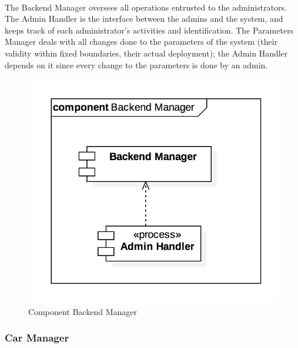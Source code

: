 		\paragraph{} The Backend Manager oversees all operations entrusted to the administrators. The Admin Handler is the interface between the admins and the system, and keeps track of each administrator's activities and identification. The Parameters Manager deals with all changes done to the parameters of the system (their validity within fixed boundaries, their actual deployment); the Admin Handler depends on it since every change to the parameters is done by an admin. %
		\begin{figure}[h]
				\includegraphics[scale=0.4, center]{img/component_diagrams/11_backend_manager.png}
				\caption{Component Backend Manager}
			\end{figure}
\FloatBarrier
	
		
		
		
		\subsubsection*{Car Manager}
			
		
